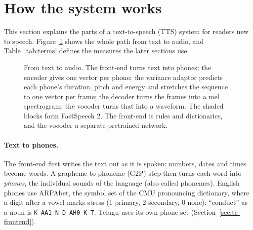 \documentclass[11pt,a4paper]{article}
\newcommand{\code}[1]{\texttt{#1}}
\begin{document}
\section{How the system works}
\label{sec:background}
This section explains the parts of a text-to-speech (TTS) system for readers new to speech. Figure~\ref{fig:pipeline}
shows the whole path from text to audio, and Table~\ref{tab:terms} defines the measures the later sections use.

\begin{figure}[H]\centering
{}
\caption{From text to audio. The front-end turns text into phones; the encoder gives one vector per phone; the
variance adaptor predicts each phone's duration, pitch and energy and stretches the sequence to one vector per
frame; the decoder turns the frames into a mel spectrogram; the vocoder turns that into a waveform. The shaded
blocks form FastSpeech 2. The front-end is rules and dictionaries, and the vocoder a separate pretrained network.}
\label{fig:pipeline}
\end{figure}

\paragraph{Text to phones.} The front-end first writes the text out as it is spoken: numbers, dates and times
become words. A grapheme-to-phoneme (G2P) step then turns each word into \emph{phones}, the individual sounds of
the language (also called phonemes). English phones use ARPAbet, the symbol set of the CMU pronouncing dictionary,
where a digit after a vowel marks stress (1 primary, 2 secondary, 0 none): ``conduct'' as a noun is
\code{K AA1 N D AH0 K T}. Telugu uses its own phone set (Section~\ref{sec:te-frontend}).
\end{document}

